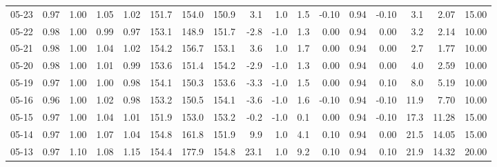 \begin{threeparttable}
{\begin{tabular}{lrrrrrrrrrrrrrrrr}
  05-23 &         0.97 &           1.00 &          1.05 &          1.02 & 151.7 & 154.0 & 150.9 &        3.1 &                      1.0 &                 1.5 &      -0.10 &      0.94 &          -0.10 &              3.1 &            2.07 &                  15.00 \\
  05-22 &         0.98 &           1.00 &          0.99 &          0.97 & 153.1 & 148.9 & 151.7 &       -2.8 &                     -1.0 &                 1.3 &       0.00 &      0.94 &           0.00 &              3.2 &            2.14 &                  10.00 \\
  05-21 &         0.98 &           1.00 &          1.04 &          1.02 & 154.2 & 156.7 & 153.1 &        3.6 &                      1.0 &                 1.7 &       0.00 &      0.94 &           0.00 &              2.7 &            1.77 &                  10.00 \\
  05-20 &         0.98 &           1.00 &          1.01 &          0.99 & 153.6 & 151.4 & 154.2 &       -2.9 &                     -1.0 &                 1.3 &       0.00 &      0.94 &           0.00 &              4.0 &            2.59 &                  10.00 \\
  05-19 &         0.97 &           1.00 &          1.00 &          0.98 & 154.1 & 150.3 & 153.6 &       -3.3 &                     -1.0 &                 1.5 &       0.00 &      0.94 &           0.10 &              8.0 &            5.19 &                  10.00 \\
  05-16 &         0.96 &           1.00 &          1.02 &          0.98 & 153.2 & 150.5 & 154.1 &       -3.6 &                     -1.0 &                 1.6 &      -0.10 &      0.94 &          -0.10 &             11.9 &            7.70 &                  10.00 \\
  05-15 &         0.97 &           1.00 &          1.04 &          1.01 & 151.9 & 153.0 & 153.2 &       -0.2 &                     -1.0 &                 0.1 &       0.00 &      0.94 &          -0.10 &             17.3 &           11.28 &                  15.00 \\
  05-14 &         0.97 &           1.00 &          1.07 &          1.04 & 154.8 & 161.8 & 151.9 &        9.9 &                      1.0 &                 4.1 &       0.10 &      0.94 &           0.00 &             21.5 &           14.05 &                  15.00 \\
  05-13 &         0.97 &           1.10 &          1.08 &          1.15 & 154.4 & 177.9 & 154.8 &       23.1 &                      1.0 &                 9.2 &       0.10 &      0.94 &           0.10 &             21.9 &           14.32 &                  20.00 \\

\end{tabular}}
\end{threeparttable}
